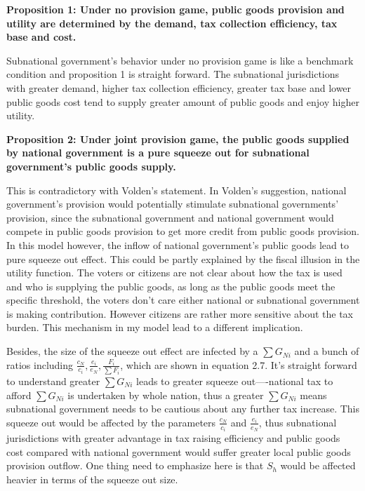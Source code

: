 \begin{itemize}
\textbf{Proposition 1: Under no provision game, public goods provision and utility are determined by the demand, tax collection efficiency, tax base and cost.}

Subnational government's behavior under no provision game is like a benchmark condition and proposition 1 is straight forward. The subnational jurisdictions with greater demand, higher tax collection efficiency, greater tax base and lower public goods cost tend to supply greater amount of public goods and enjoy higher utility.

\textbf{Proposition 2: Under joint provision game, the public goods supplied by national government is a pure squeeze out for subnational government's public goods supply.}

This is contradictory with Volden's statement. In Volden's suggestion, national government's provision would potentially stimulate subnational governments' provision, since the subnational government and national government would compete in public goods provision to get more credit from public goods provision. In this model however, the inflow of national government's public goods lead to pure squeeze out effect. This could be partly explained by the fiscal illusion in the utility function. The voters or citizens are not clear about how the tax is used and who is supplying the public goods, as long as the public goods meet the specific threshold, the voters don't care either national or subnational government is making contribution. However citizens are rather more sensitive about the tax burden. This mechanism in my model lead to a different implication.

Besides, the size of the squeeze out effect are infected by a $\sum G_{Ni}$ and a bunch of ratios including $\frac{c_N}{c_i}, \frac{e_i}{e_N}, \frac{F_i}{\sum F_i}$, which are shown in equation 2.7. It's straight forward to understand greater $\sum G_{Ni}$ leads to greater squeeze out----national tax to afford $\sum G_{Ni}$ is undertaken by whole nation, thus a greater $\sum G_{Ni}$ means subnational government needs to be cautious about any further tax increase. This squeeze out would be affected by the parameters $\frac{c_N}{c_i} $ and $\frac{e_i}{e_N}$, thus subnational jurisdictions with greater advantage in tax raising efficiency and public goods cost compared with national government would suffer greater local public goods provision outflow. One thing need to emphasize here is that $S_h$ would be affected heavier in terms of the squeeze out size.


\end{itemize}

